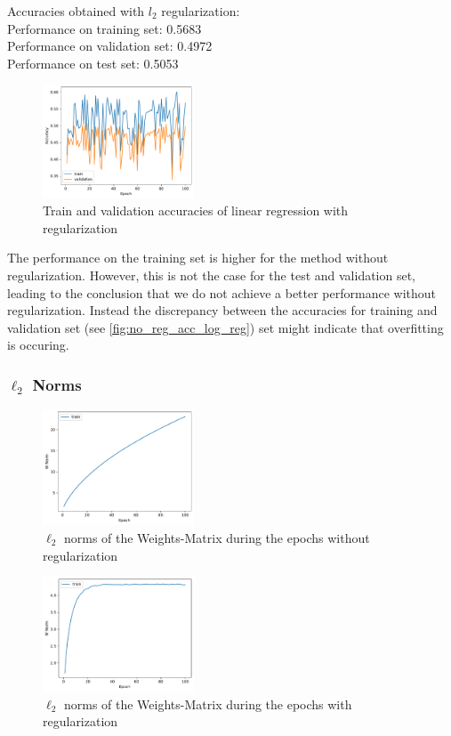 Accuracies obtained with $l_2$ regularization: \\
Performance on training set:  0.5683\\
Performance on validation set: 0.4972 \\
Performance on test set:  0.5053 \\


\begin{figure}[H]
    \centering
    \includegraphics[width=0.4\textwidth]{images/Q1-logistic_regression-accs_with.pdf} 
    \caption{Train and validation accuracies of linear regression with regularization}
    \label{fig:dd}
\end{figure}

The performance on the training set is higher for the method without regularization. However, this is not the case for the test and validation set, leading to the conclusion that we do not achieve a better performance without regularization. Instead the discrepancy between the accuracies for training and validation set (see \ref{fig:no_reg_acc_log_reg}) set might indicate that overfitting is occuring.

\subsubsection{$\ell_2$ Norms}
\begin{figure}[H]
    \centering
    \includegraphics[width=0.4\textwidth]{images/Q1-logistic_regression-w_norms.pdf} 
    \caption{$\ell_2$ norms of the Weights-Matrix during the epochs without regularization }
    \label{fig:dd}
\end{figure}

\begin{figure}[H]
    \centering
    \includegraphics[width=0.4\textwidth]{images/Q1-logistic_regression-w_norms_with.pdf} 
    \caption{$\ell_2$ norms of the Weights-Matrix during the epochs with regularization}
    \label{fig:dd}
\end{figure}


